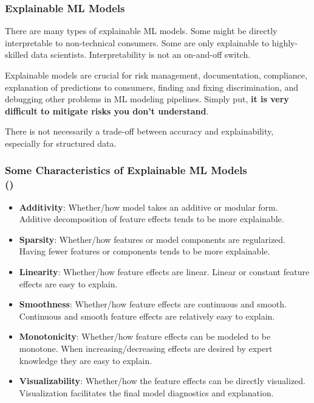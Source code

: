 \documentclass[11pt,aspectratio=169,hyperref={colorlinks}]{beamer}
\begin{document}
		\begin{frame}
	
			\frametitle{Explainable ML Models}			
	
			\small
			
			There are many types of explainable ML models. Some might be directly interpretable to non-technical consumers. Some are only explainable to highly-skilled data scientists. Interpretability is not an on-and-off switch.
			
			\vspace{10pt}
			
			Explainable models are crucial for risk management, documentation, compliance, explanation of predictions to consumers, finding and fixing discrimination, and  debugging other problems in ML modeling pipelines. Simply put, \textbf{it is very difficult to mitigate risks you don't understand}.
			
			\vspace{10pt}
			
			There is not necessarily a trade-off between accuracy and explainability, especially for structured data.
			
			\normalsize
			
		\end{frame}	

		\begin{frame}
	
			\frametitle{Some Characteristics of Explainable ML Models\\ (\small{\cite{sudjianto2021designing})}}			
			
			\small
			
			\begin{itemize}
				\item \textbf{Additivity}: Whether/how model takes an additive or modular form. Additive decomposition of feature effects tends to be more explainable.
				\item \textbf{Sparsity}: Whether/how features or model components are regularized. Having fewer features or components tends to be more explainable.
				\item \textbf{Linearity}: Whether/how feature effects are linear. Linear or constant feature effects are easy to explain.
				\item \textbf{Smoothness}: Whether/how feature effects are continuous and smooth. Continuous and smooth feature effects are relatively easy to explain.
				\item \textbf{Monotonicity}: Whether/how feature effects can be modeled to be monotone. When increasing/decreasing effects are desired by expert knowledge they are easy to explain.
				\item \textbf{Visualizability}: Whether/how the feature effects can be directly visualized. Visualization facilitates the final model diagnostics and explanation.
			\end{itemize}
			
			\normalsize
			
		\end{frame}	
\end{document}
